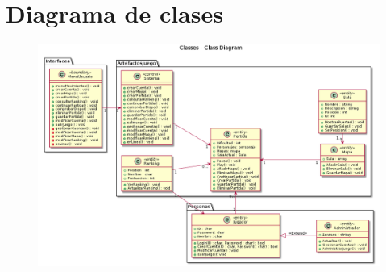\section{Diagrama de clases}\label{sec:uc}




  \begin{figure}[ht]
  \centering
  \includegraphics[width=1\textwidth]{./imatges/Diagrama_Clases_v4.png}
  \label{fig:usecase}
   \end{figure}
   